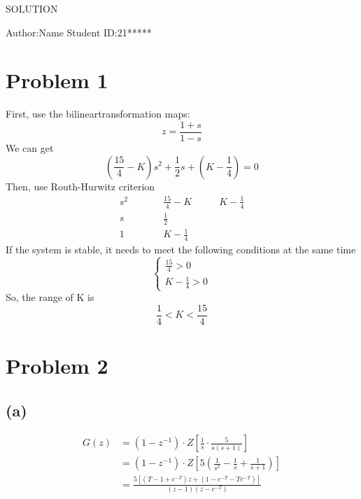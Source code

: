 ﻿\documentclass{myart}
\begin{document}
\renewcommand\figurename{Fig}
\thispagestyle{empty}
\newpage

\pagestyle{plain}

\begin{center}
\huge SOLUTION
\end{center}

\begin{center}
\large Author:Name \qquad Student ID:21*****
\end{center}

\section{Problem 1}
First, use the bilineartransformation maps:
\begin{equation}
z=\frac{1+s}{1-s}
\end{equation}
\qquad We can get
\begin{equation}
(\frac{15}{4}-K)s^2+\frac{1}{2}s+(K-\frac{1}{4})=0
\end{equation}
\qquad Then, use Routh-Hurwitz criterion
\begin{equation}
\begin{aligned}
s^2& \qquad &\frac{15}{4}-K \qquad &K-\frac{1}{4}\\
s&   \qquad &\frac{1}{2}    \qquad &\\
1&   \qquad &K-\frac{1}{4}  \qquad &
\end{aligned}
\end{equation}
\qquad If the system is stable, it needs to meet the following conditions at the same time
\begin{equation}
\left.
\begin{cases}
\frac{15}{4}>0\\
K-\frac{1}{4}>0
\end{cases}
\right.
\end{equation}
\qquad So, the range of K is
\begin{equation}
\frac{1}{4}<K<\frac{15}{4}
\end{equation}

\section{Problem 2}
\subsection{(a)}
\begin{equation}
\begin{split}
G(z)&=(1-z^{-1})\cdot Z[\frac{1}{s}\cdot \frac{5}{s(s+1)}] \\
&=(1-z^{-1})\cdot Z[5(\frac{1}{s^2}-\frac{1}{s}+\frac{1}{s+1})] \\
&=\frac{5[(T-1+e^{-T})z+(1-e^{-T}-Te^{-T})]}{(z-1)(z-e^{-T})}
\end{split}
\end{equation}
\end{document}
